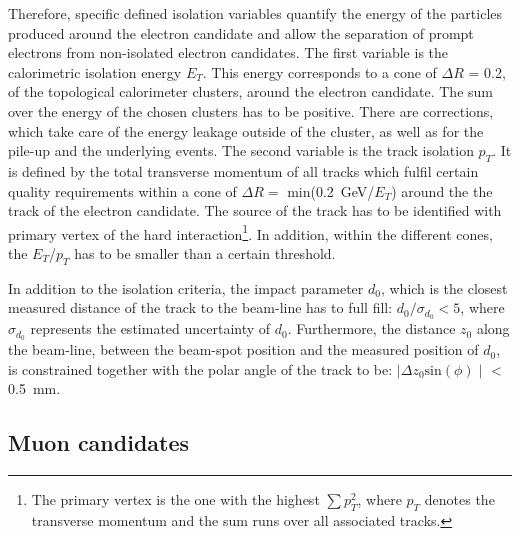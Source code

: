  Therefore, specific defined isolation variables quantify the energy of the particles produced around the electron candidate and allow the separation of prompt electrons from non-isolated electron candidates.  The first variable is  the calorimetric isolation energy $E_T$.  This energy corresponds to a cone of  $\Delta R$ = 0.2, of the  topological calorimeter clusters, around the electron candidate. The sum over the energy of the chosen clusters has to be positive. There are corrections, which take care of the energy leakage outside of the cluster, as well as for the pile-up and the underlying events. The second variable is the track isolation $p_T$. It is defined by the total transverse momentum of all tracks which fulfil  certain quality requirements within a cone of $\Delta R =$ min(0.2~GeV/$E_T$) around the the track of the electron candidate. The source of the track has to be identified with primary vertex of the hard interaction\footnote{The primary vertex is the one  with the highest   $\sum p_T^2$, where  $p_T$ denotes the transverse momentum and the sum runs over all associated  tracks.}. In addition, within the different cones, the $E_T$/$p_T$ has to be smaller than a certain threshold.~\cite{ATLAS:2016iqc}

 In addition to the isolation criteria, the impact parameter $d_0$, which is the closest measured distance of the track to the beam-line has to full fill: $d_0/\sigma_{d_0} <5$, where  $\sigma_{d_0}$ represents the estimated uncertainty of $d_0$. Furthermore, the distance $z_0$ along the beam-line, between the beam-spot position and the measured position of $d_0$,  is constrained together with the polar angle of the track to be: $\mid \Delta z_0 \text{sin}(\phi) \mid$ < 0.5~mm. ~\cite{ATLAS:2016iqc}







\subsection{Muon candidates}

